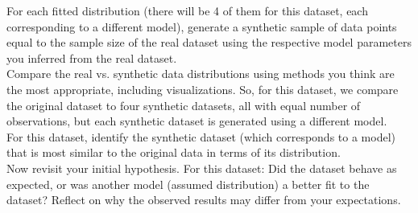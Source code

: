 For each fitted distribution (there will be 4 of them for this dataset, each corresponding to a different model), generate a synthetic sample of data points equal to the sample size of the real dataset using the respective model parameters you inferred from the real dataset.\\

Compare the real vs. synthetic data distributions using methods you think are the most appropriate, including visualizations. So, for this dataset, we compare the original dataset to four synthetic datasets, all with equal number of observations, but each synthetic dataset is generated using a different model.\\

For this dataset, identify the synthetic dataset (which corresponds to a model) that is most similar to the original data in terms of its distribution.\\

Now revisit your initial hypothesis. For this dataset: Did the dataset behave as expected, or was another model (assumed distribution) a better fit to the dataset? Reflect on why the observed results may differ from your expectations.\\  